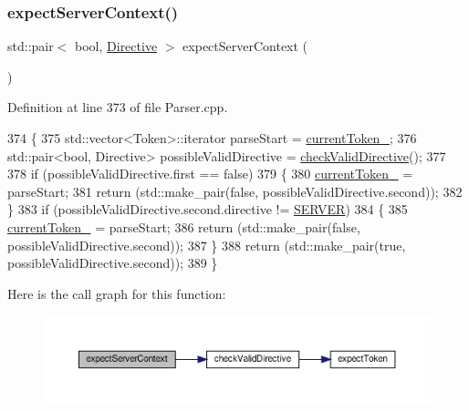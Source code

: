\subsubsection{\texorpdfstring{expect\+Server\+Context()}{expectServerContext()}}
{\footnotesize\ttfamily std\+::pair$<$ bool, \hyperlink{classft_1_1_directive}{Directive} $>$ expect\+Server\+Context (\begin{DoxyParamCaption}{ }\end{DoxyParamCaption})\hspace{0.3cm}{\ttfamily [private]}}



Definition at line 373 of file Parser.\+cpp.


\begin{DoxyCode}
374     \{
375         std::vector<Token>::iterator parseStart = \hyperlink{classft_1_1_parser_a942c5b794d108f144c5b5028aaa34cb6}{currentToken\_};
376         std::pair<bool, Directive> possibleValidDirective = \hyperlink{classft_1_1_parser_ad48298d21629daf7c9a31e101bf322ba}{checkValidDirective}();
377 
378         \textcolor{keywordflow}{if} (possibleValidDirective.first == \textcolor{keyword}{false}) 
379         \{
380             \hyperlink{classft_1_1_parser_a942c5b794d108f144c5b5028aaa34cb6}{currentToken\_} = parseStart;
381             \textcolor{keywordflow}{return} (std::make\_pair(\textcolor{keyword}{false}, possibleValidDirective.second));
382         \}
383         \textcolor{keywordflow}{if} (possibleValidDirective.second.directive != \hyperlink{namespaceft_a5a5554dff10f0dc50bae4cc5825ad75da67c96b24b23bcb408bae7626730a04b7}{SERVER})
384         \{
385             \hyperlink{classft_1_1_parser_a942c5b794d108f144c5b5028aaa34cb6}{currentToken\_} = parseStart;
386             \textcolor{keywordflow}{return} (std::make\_pair(\textcolor{keyword}{false}, possibleValidDirective.second));
387         \}
388         \textcolor{keywordflow}{return} (std::make\_pair(\textcolor{keyword}{true}, possibleValidDirective.second));
389     \}
\end{DoxyCode}
Here is the call graph for this function\+:
\nopagebreak
\begin{figure}[H]
\begin{center}
\leavevmode
\includegraphics[width=350pt]{classft_1_1_parser_a72f108d920a35284bf8f740bb8240acd_cgraph}
\end{center}
\end{figure}

